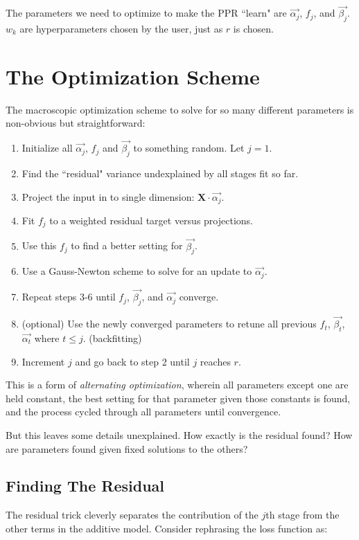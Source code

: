 \documentclass[12pt]{article}
\begin{document}
The parameters we need to optimize to make the PPR ``learn" are $\vec{\alpha_j}$, $f_j$, and $\vec{\beta_j}$. $w_k$ are hyperparameters chosen by the user, just as $r$ is chosen.

\section{The Optimization Scheme}

The macroscopic optimization scheme to solve for so many different parameters is non-obvious but straightforward:
\begin{enumerate}
	\setlength\itemsep{-2mm}
	\item Initialize all $\vec{\alpha_j}$, $f_j$ and $\vec{\beta_j}$ to something random. Let $j=1$. 
	\item Find the ``residual" variance undexplained by all stages fit so far.
	\item Project the input in to single dimension: $\pmb{X} \cdot \vec{\alpha_j}$.
	\item Fit $f_j$ to a weighted residual target versus projections.
	\item Use this $f_j$ to find a better setting for $\vec{\beta_j}$.
	\item Use a Gauss-Newton scheme to solve for an update to $\vec{\alpha_j}$.
	\item Repeat steps 3-6 until $f_j$, $\vec{\beta_j}$, and $\vec{\alpha_j}$ converge.
	\item (optional) Use the newly converged parameters to retune all previous $f_t$, $\vec{\beta_t}$, $\vec{\alpha_t}$ where $t \leq j$. (backfitting)
	\item Increment $j$ and go back to step 2 until $j$ reaches $r$.
\end{enumerate}

This is a form of \textit{alternating optimization}, wherein all parameters except one are held constant, the best setting for that parameter given those constants is found, and the process cycled through all parameters until convergence.

But this leaves some details unexplained. How exactly is the residual found? How are parameters found given fixed solutions to the others?

\subsection{Finding The Residual}

The residual trick cleverly separates the contribution of the $j$th stage from the other terms in the additive model. Consider rephrasing the loss function as:
\end{document}
